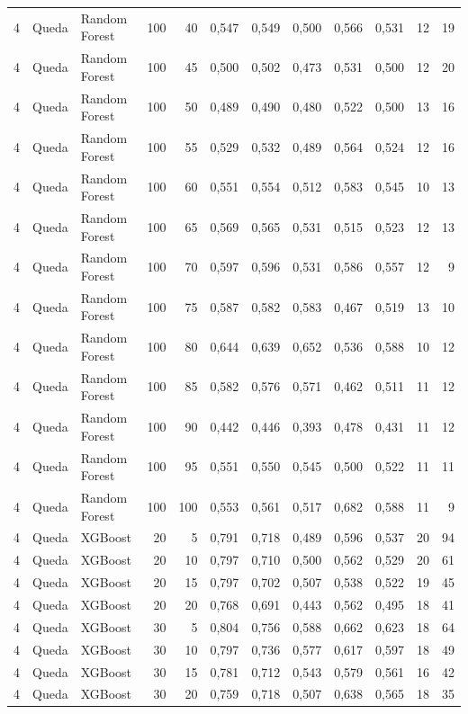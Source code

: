 \begin{longtable}{@{}rllrrrrrrrrr@{}}
4 & Queda & Random Forest & 100 & 40 & 0,547 & 0,549 & 0,500 & 0,566 & 0,531 & 12 & 19 \\
4 & Queda & Random Forest & 100 & 45 & 0,500 & 0,502 & 0,473 & 0,531 & 0,500 & 12 & 20 \\
4 & Queda & Random Forest & 100 & 50 & 0,489 & 0,490 & 0,480 & 0,522 & 0,500 & 13 & 16 \\
4 & Queda & Random Forest & 100 & 55 & 0,529 & 0,532 & 0,489 & 0,564 & 0,524 & 12 & 16 \\
4 & Queda & Random Forest & 100 & 60 & 0,551 & 0,554 & 0,512 & 0,583 & 0,545 & 10 & 13 \\
4 & Queda & Random Forest & 100 & 65 & 0,569 & 0,565 & 0,531 & 0,515 & 0,523 & 12 & 13 \\
4 & Queda & Random Forest & 100 & 70 & 0,597 & 0,596 & 0,531 & 0,586 & 0,557 & 12 & 9 \\
4 & Queda & Random Forest & 100 & 75 & 0,587 & 0,582 & 0,583 & 0,467 & 0,519 & 13 & 10 \\
4 & Queda & Random Forest & 100 & 80 & 0,644 & 0,639 & 0,652 & 0,536 & 0,588 & 10 & 12 \\
4 & Queda & Random Forest & 100 & 85 & 0,582 & 0,576 & 0,571 & 0,462 & 0,511 & 11 & 12 \\
4 & Queda & Random Forest & 100 & 90 & 0,442 & 0,446 & 0,393 & 0,478 & 0,431 & 11 & 12 \\
4 & Queda & Random Forest & 100 & 95 & 0,551 & 0,550 & 0,545 & 0,500 & 0,522 & 11 & 11 \\
4 & Queda & Random Forest & 100 & 100 & 0,553 & 0,561 & 0,517 & 0,682 & 0,588 & 11 & 9 \\
4 & Queda & XGBoost & 20 & 5 & 0,791 & 0,718 & 0,489 & 0,596 & 0,537 & 20 & 94 \\
4 & Queda & XGBoost & 20 & 10 & 0,797 & 0,710 & 0,500 & 0,562 & 0,529 & 20 & 61 \\
4 & Queda & XGBoost & 20 & 15 & 0,797 & 0,702 & 0,507 & 0,538 & 0,522 & 19 & 45 \\
4 & Queda & XGBoost & 20 & 20 & 0,768 & 0,691 & 0,443 & 0,562 & 0,495 & 18 & 41 \\
4 & Queda & XGBoost & 30 & 5 & 0,804 & 0,756 & 0,588 & 0,662 & 0,623 & 18 & 64 \\
4 & Queda & XGBoost & 30 & 10 & 0,797 & 0,736 & 0,577 & 0,617 & 0,597 & 18 & 49 \\
4 & Queda & XGBoost & 30 & 15 & 0,781 & 0,712 & 0,543 & 0,579 & 0,561 & 16 & 42 \\
4 & Queda & XGBoost & 30 & 20 & 0,759 & 0,718 & 0,507 & 0,638 & 0,565 & 18 & 35 \\

\end{longtable}
